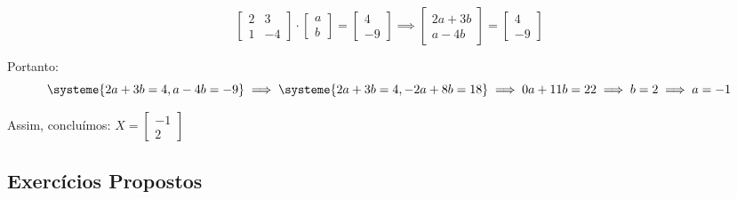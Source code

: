 \begin{exercise}
\begin{enumerate}
{        \begin{equation*}
          \begin{bmatrix}
            2 & 3 \\
            1 & -4
          \end{bmatrix} \cdot \begin{bmatrix}
            a \\
            b
          \end{bmatrix} = \begin{bmatrix}
            4 \\
            -9
          \end{bmatrix} \implies \begin{bmatrix}
            2a + 3b \\
            a - 4b
          \end{bmatrix} = \begin{bmatrix}
            4 \\
            -9
          \end{bmatrix}
        \end{equation*}

        Portanto: \[
          \systeme{
            2a + 3b = 4,
            a - 4b = -9
          } \implies 
          \systeme{
            2a + 3b = 4,
            -2a + 8b = 18
          } \implies  
          0a + 11b = 22 \implies b = 2 \implies a = -1 
        \]

        Assim, concluímos: $X = \begin{bmatrix}
          -1 \\
          2
        \end{bmatrix}$
      }
  \end{enumerate}
\end{exercise}

\subsection{Exercícios Propostos}

